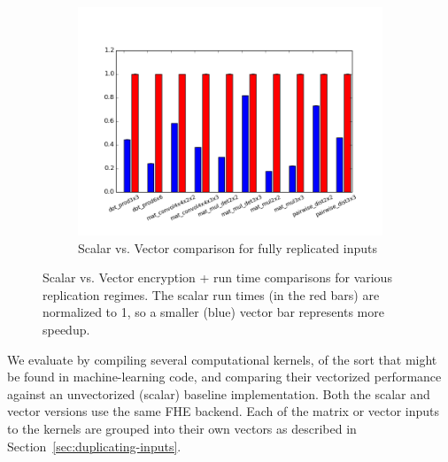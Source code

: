 \begin{figure}
     \vspace{-2.5em}
     
    \begin{subfigure}{\linewidth}
        \includegraphics[width=1\textwidth]{figures/newAspectRatioGraphs/DataReplicatedENC+RUN.png}
            \vspace{-3em}
        \caption{Scalar vs. Vector comparison for fully replicated inputs}\label{fig:ml-kernels-repl}
    \end{subfigure}
    \caption{Scalar vs. Vector encryption + run time comparisons for various replication regimes. The scalar run times (in the red bars) are normalized to 1, so a smaller (blue) vector bar represents more speedup.}\label{fig:ml-kernels}
\end{figure}

We evaluate \system by compiling several computational kernels, of the sort that might be found in machine-learning code, and comparing their vectorized performance against an unvectorized (scalar) baseline implementation. Both the scalar and vector versions use the same FHE backend.
Each of the matrix or vector inputs to the kernels are grouped into their own vectors as described in Section~\ref{sec:duplicating-inputs}.

